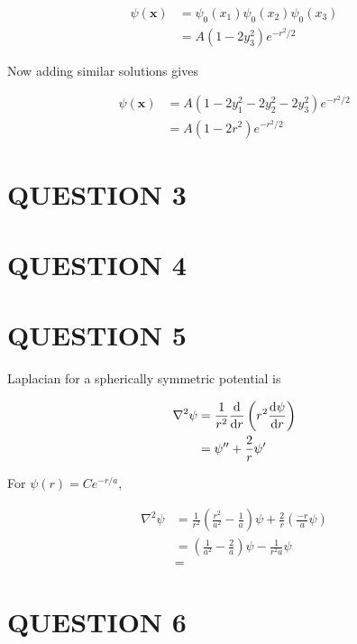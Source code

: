 \documentclass[a4paper]{article}
\begin{document}
\begin{align*}
 \psi(\mathbf{x}) & = \psi_{0}(x_{1})\psi_{0}(x_{2}) \psi_{0}(x_{3}) \\
& = A (1 - 2y_{3}^{2}) e^{- r^{2}/2}
\end{align*}

Now adding similar solutions gives

\begin{align*}
 \psi(\mathbf{x}) & = A ( 1 - 2y_{1}^{2}   - 2y_{2}^{2} - 2y_{3}^{2}  ) e^{- r^{2}/2} \\
 & = A ( 1 - 2r^{2} ) e^{- r^{2}/2}
\end{align*}









 
 

\section{QUESTION 3}

\section{QUESTION 4}

\section{QUESTION 5}

Laplacian for a spherically symmetric potential is

\begin{align*}
\nabla^{2} \psi & = \frac{1}{r^{2}} \frac{\mathrm{d} }{\mathrm{d} r} \left( r^{2} \frac{\mathrm{d} \psi }{\mathrm{d} r} \right)  \\
& = \psi'' + \frac{2}{r} \psi'
\end{align*}

For $ \psi(r) = C e^{-r/a}$,

\begin{align*}
\nabla^{2} \psi & = \frac{1}{r^{2}} \left(  \frac{r^{2}}{a^{2}} - \frac{1}{a} \right) \psi + \frac{2}{r} \left( \frac{-r}{a} \psi \right)  \\
& = \left(  \frac{1}{a^{2}}  - \frac{2}{a} \right) \psi - \frac{1}{r^{2}a}\psi  \\
& = 
\end{align*} 





\section{QUESTION 6}
\end{document}
